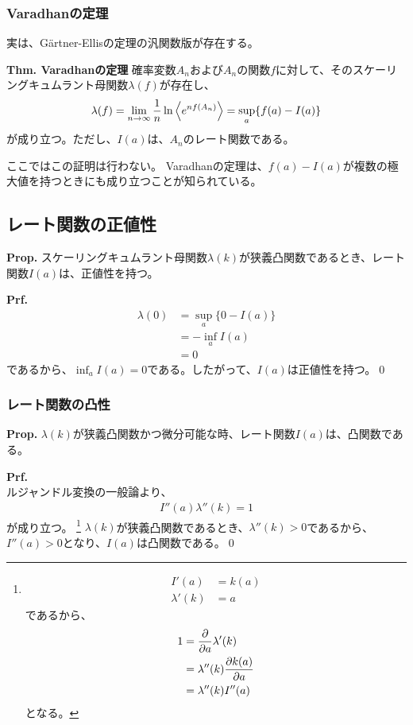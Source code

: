 \documentclass[a4paper,11pt]{jsarticle}
\numberwithin{equation}{section}
\begin{document}
\subsubsection{Varadhanの定理}
実は、G\"{a}rtner-Ellisの定理の汎関数版が存在する。
\begin{itembox}[l]{\textbf{Thm. Varadhanの定理}}
    確率変数$A_n$および$A_n$の関数$f$に対して、そのスケーリングキュムラント母関数$\lambda(f)$が存在し、
    \begin{align}
        \lambda(f) = \lim_{n \to \infty} \frac{1}{n} \ln \ev{e^{nf(A_n)}} = \sup_{a} \{f(a) - I(a)\}
    \end{align}
    が成り立つ。ただし、$I(a)$は、$A_n$のレート関数である。
\end{itembox}
ここではこの証明は行わない。
Varadhanの定理は、$f(a)-I(a)$が複数の極大値を持つときにも成り立つことが知られている。

\subsection{レート関数の正値性}
\begin{itembox}[l]{\textbf{Prop.}}
    スケーリングキュムラント母関数$\lambda(k)$が狭義凸関数であるとき、レート関数$I(a)$は、正値性を持つ。
\end{itembox}
\textbf{Prf.}\\
\begin{align}
    \lambda(0) &= \sup_{a} \{0 - I(a)\} \\
    &= -\inf_{a} I(a)\\
    &=0
\end{align}
であるから、$\inf_{a} I(a) = 0$である。したがって、$I(a)$は正値性を持つ。\qed

\subsubsection{レート関数の凸性}
\begin{itembox}[l]{\textbf{Prop.}}
    $\lambda(k)$が狭義凸関数かつ微分可能な時、レート関数$I(a)$は、凸関数である。
\end{itembox}
\textbf{Prf.}\\
ルジャンドル変換の一般論より、
\begin{align}
    I''(a) \lambda''(k) = 1
\end{align}
が成り立つ。
\footnote{
    \begin{align}
        I'(a) &= k(a)\\
        \lambda'(k) &= a
    \end{align}
    であるから、
    \begin{align}
        1 &= \pdv{a}\lambda '(k)\\
        &= \lambda''(k) \pdv{k(a)}{a}\\
        &= \lambda''(k) I''(a)
    \end{align}
    となる。 
}
$\lambda(k)$が狭義凸関数であるとき、$\lambda''(k) > 0$であるから、$I''(a) > 0$となり、$I(a)$は凸関数である。\qed
\end{document}
